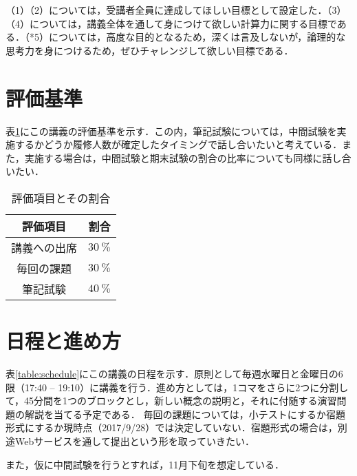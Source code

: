 （1）（2）については，受講者全員に達成してほしい目標として設定した．（3）（4）については，講義全体を通して身につけて欲しい計算力に関する目標である．（*5）については，高度な目的となるため，深くは言及しないが，論理的な思考力を身につけるため，ぜひチャレンジして欲しい目標である．

\section{評価基準}
表\ref{table:criteria}にこの講義の評価基準を示す．この内，筆記試験については，中間試験を実施するかどうか履修人数が確定したタイミングで話し合いたいと考えている．また，実施する場合は，中間試験と期末試験の割合の比率についても同様に話し合いたい．

\begin{table}[!h]
	\centering
	\caption{評価項目とその割合}
	\label{table:criteria}
	\begin{tabular}{c|c}
		評価項目 & 割合 \\
		\hline
		講義への出席 & $\SI{30}{\percent}$ \\
		毎回の課題 & $\SI{30}{\percent}$ \\
		筆記試験 & $\SI{40}{\percent}$ \\
	\end{tabular}
\end{table}

\section{日程と進め方}
表\ref{table:schedule}にこの講義の日程を示す．原則として毎週水曜日と金曜日の6限（17:40 -- 19:10）に講義を行う．進め方としては，1コマをさらに2つに分割して，45分間を1つのブロックとし，新しい概念の説明と，それに付随する演習問題の解説を当てる予定である．
毎回の課題については，小テストにするか宿題形式にするか現時点（2017/9/28）では決定していない．宿題形式の場合は，別途Webサービスを通して提出という形を取っていきたい．

また，仮に中間試験を行うとすれば，11月下旬を想定している．

